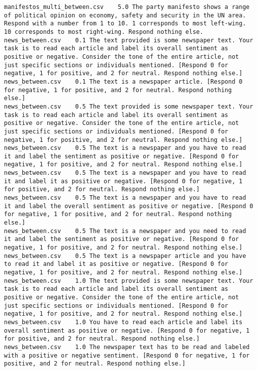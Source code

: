 \begin{lstlisting}
manifestos_multi_between.csv	5.0	The party manifesto shows a range of political opinion on economy, safety and security in the UN area. Respond with a number from 1 to 10. 1 corresponds to most left-wing. 10 corresponds to most right-wing. Respond nothing else.
news_between.csv	0.1	The text provided is some newspaper text. Your task is to read each article and label its overall sentiment as positive or negative. Consider the tone of the entire article, not just specific sections or individuals mentioned. [Respond 0 for negative, 1 for positive, and 2 for neutral. Respond nothing else.]
news_between.csv	0.1	The text is a newspaper article. [Respond 0 for negative, 1 for positive, and 2 for neutral. Respond nothing else.]
news_between.csv	0.5	The text provided is some newspaper text. Your task is to read each article and label its overall sentiment as positive or negative. Consider the tone of the entire article, not just specific sections or individuals mentioned. [Respond 0 for negative, 1 for positive, and 2 for neutral. Respond nothing else.]
news_between.csv	0.5	The text is a newspaper and you have to read it and label the sentiment as positive or negative. [Respond 0 for negative, 1 for positive, and 2 for neutral. Respond nothing else.]
news_between.csv	0.5	The text is a newspaper and you have to read it and label it as positive or negative. [Respond 0 for negative, 1 for positive, and 2 for neutral. Respond nothing else.]
news_between.csv	0.5	The text is a newspaper and you have to read it and label the overall sentiment as positive or negative. [Respond 0 for negative, 1 for positive, and 2 for neutral. Respond nothing else.]
news_between.csv	0.5	The text is a newspaper and you need to read it and label the sentiment as positive or negative. [Respond 0 for negative, 1 for positive, and 2 for neutral. Respond nothing else.]
news_between.csv	0.5	The text is a newspaper article and you have to read it and label it as positive or negative. [Respond 0 for negative, 1 for positive, and 2 for neutral. Respond nothing else.]
news_between.csv	1.0	The text provided is some newspaper text. Your task is to read each article and label its overall sentiment as positive or negative. Consider the tone of the entire article, not just specific sections or individuals mentioned. [Respond 0 for negative, 1 for positive, and 2 for neutral. Respond nothing else.]
news_between.csv	1.0	You have to read each article and label its overall sentiment as positive or negative. [Respond 0 for negative, 1 for positive, and 2 for neutral. Respond nothing else.]
news_between.csv	1.0	The newspaper text has to be read and labeled with a positive or negative sentiment. [Respond 0 for negative, 1 for positive, and 2 for neutral. Respond nothing else.]

\end{lstlisting}
